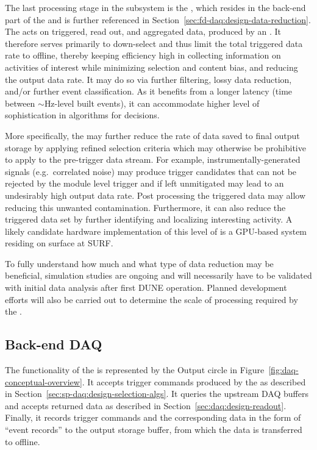The last processing stage in the  subsystem is the
, which resides in the back-end part of the  and
is further referenced in Section~\ref{sec:fd-daq:design-data-reduction}.
The  acts on triggered, read out, and aggregated data,
produced by an . 
It therefore serves primarily to down-select and thus
limit the total triggered data rate to offline, thereby keeping %
efficiency high in collecting information on activities of interest
while minimizing selection and content bias, and reducing the output data
rate. It may do so via 
further filtering, lossy data reduction, and/or further event
classification. As it benefits from a longer latency (time between
$\sim$Hz-level built events), it can accommodate higher level of
sophistication in algorithms for  decisions.

More specifically, the  may further reduce the rate of data saved to final output storage by
applying refined selection criteria which may otherwise be prohibitive
to apply to the pre-trigger data stream.  For example, instrumentally-generated signals (e.g.~correlated noise)
may produce trigger candidates that can not be rejected by the module
level trigger and if left unmitigated may lead to an undesirably high
output data rate. 
Post processing the triggered data may allow reducing this unwanted
contamination.
Furthermore, it can also reduce the triggered data set by further identifying
and localizing interesting activity. A likely candidate hardware
implementation of this level of  is a GPU-based system
residing on surface at SURF.

To fully understand how much and what type of data reduction may be
beneficial, simulation studies are ongoing  and will
necessarily have to be
validated with initial data analysis after
first DUNE  operation. Planned 
development efforts will also be carried out to determine the scale of
processing required by the .


\subsection{Back-end DAQ}
\label{sec:fd-daq:design-backend}

The functionality of the  is represented by the Output circle in Figure~\ref{fig:daq-conceptual-overview}. 
It accepts trigger commands produced by the  as described in Section~\ref{sec:sp-daq:design-selection-algs}. 
It queries the upstream DAQ buffers and accepts returned data as described in Section~\ref{sec:daq:design-readout}. 
Finally, it records trigger commands and the corresponding data in the
form of ``event records'' to the output storage buffer, from which the data is transferred to offline.

